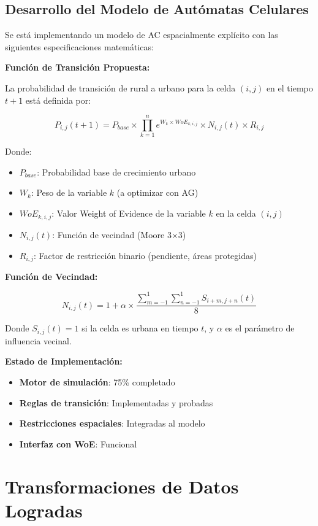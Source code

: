 \documentclass[12pt,letterpaper]{article}
\begin{document}
\subsection{Desarrollo del Modelo de Autómatas Celulares}

Se está implementando un modelo de AC espacialmente explícito con las siguientes especificaciones matemáticas:

\textbf{Función de Transición Propuesta:}

La probabilidad de transición de rural a urbano para la celda $(i,j)$ en el tiempo $t+1$ está definida por:

$$P_{i,j}(t+1) = P_{base} \times \prod_{k=1}^{n} e^{W_k \times WoE_{k,i,j}} \times N_{i,j}(t) \times R_{i,j}$$

Donde:
\begin{itemize}
\item $P_{base}$: Probabilidad base de crecimiento urbano
\item $W_k$: Peso de la variable $k$ (a optimizar con AG)
\item $WoE_{k,i,j}$: Valor Weight of Evidence de la variable $k$ en la celda $(i,j)$
\item $N_{i,j}(t)$: Función de vecindad (Moore 3×3)
\item $R_{i,j}$: Factor de restricción binario (pendiente, áreas protegidas)
\end{itemize}

\textbf{Función de Vecindad:}

$$N_{i,j}(t) = 1 + \alpha \times \frac{\sum_{m=-1}^{1} \sum_{n=-1}^{1} S_{i+m,j+n}(t)}{8}$$

Donde $S_{i,j}(t) = 1$ si la celda es urbana en tiempo $t$, y $\alpha$ es el parámetro de influencia vecinal.

\textbf{Estado de Implementación:}
\begin{itemize}
\item \textbf{Motor de simulación}: 75\% completado
\item \textbf{Reglas de transición}: Implementadas y probadas
\item \textbf{Restricciones espaciales}: Integradas al modelo
\item \textbf{Interfaz con WoE}: Funcional
\end{itemize}

\section{Transformaciones de Datos Logradas}
\end{document}
